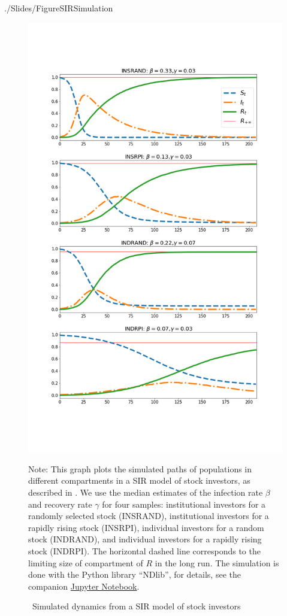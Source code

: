 \newpage

\begin{verbatimwrite}{./Slides/FigureSIRSimulation}%
\begin{figure}[!ht] \centering  %
	\caption{ ~Simulated dynamics from a SIR model of stock investors}
	\label{fig:sir_simulate}
	\centerline{\includegraphics[width=\textwidth]{./figures/sir_simulate.png}}
	\begin{flushleft}
	{\footnotesize Note: This graph plots the simulated paths of populations in different compartments in a SIR model of stock investors, as described in \cite{shiller1989survey}. We use the median estimates of the infection rate $\beta$ and recovery rate $\gamma$ for four samples: institutional investors for a randomly selected stock (INSRAND), institutional investors for a rapidly rising stock (INSRPI), individual investors for a random stock (INDRAND), and individual investors for a rapidly rising stock (INDRPI). The horizontal dashed line corresponds to the limiting size of compartment of $R$ in the long run. The simulation is done with the Python library ``NDlib'', for details, see the companion \href{https://github.com/llorracc/EpiExp/blob/master/SIR_Ndlib.ipynb}{Jupyter Notebook}. }

\end{flushleft}
\end{figure}
\end{verbatimwrite}
